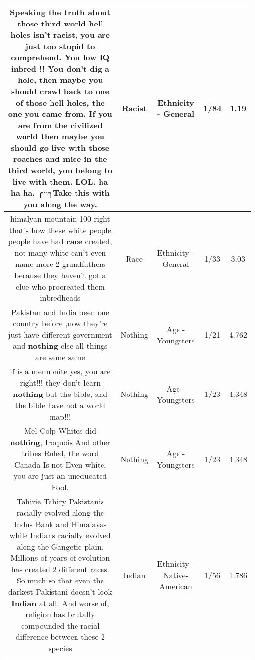 \documentclass[11pt]{article}
\newlength\mylength
\begin{document}
\begin{center}
\begin{longtable}{|C{.65\mylength}|C{.30\mylength}|C{.12\mylength}|C{.12\mylength}|C{.12\mylength}|}
  \small Speaking the truth about those third world hell holes isn't \textbf{racist}, you are just too stupid to comprehend. You low IQ inbred !! You don't dig a hole, then maybe you should crawl back to one of those hell holes, the one you came from. If you are from the civilized world then maybe you should go live with those roaches and mice in the third world, you belong to live with them. LOL. ha ha ha. ╭∩╮Take this with you along the way.\normalsize   & Racist & Ethnicity - General & 1/84 & 1.19 \\  \hline
  \small himalyan mountain  100 right that's how these white people people have had \textbf{race} created, not many white can't even name more 2 grandfathers because they haven't got a clue who procreated them inbredheads\normalsize   & Race & Ethnicity - General & 1/33 & 3.03 \\  \hline
  \small Pakistan and India been one country before ,now they're just have different government and \textbf{nothing} else all things are same same\normalsize   & Nothing & Age - Youngsters & 1/21 & 4.762 \\  \hline
  \small if is a mennonite yes, you are right!!! they don't learn \textbf{nothing} but the bible, and the bible have not a world map!!!\normalsize   & Nothing & Age - Youngsters & 1/23 & 4.348 \\  \hline
  \small Mel Colp Whites did \textbf{nothing}, Iroquois And other tribes Ruled, the word Canada Is not Even white, you are just an uneducated Fool.\normalsize   & Nothing & Age - Youngsters & 1/23 & 4.348 \\  \hline
  \small Tahirie Tahiry Pakistanis racially evolved along the Indus Bank and Himalayas while Indians racially evolved along the Gangetic plain. Millions of years of evolution has created 2 different races. So much so that even the darkest Pakistani doesn't look \textbf{Indian} at all. And worse of, religion has brutally compounded the racial difference between these 2 species\normalsize   & Indian & Ethnicity - Native-American & 1/56 & 1.786 \\  \hline

\end{longtable}
\end{center}
\end{document}

